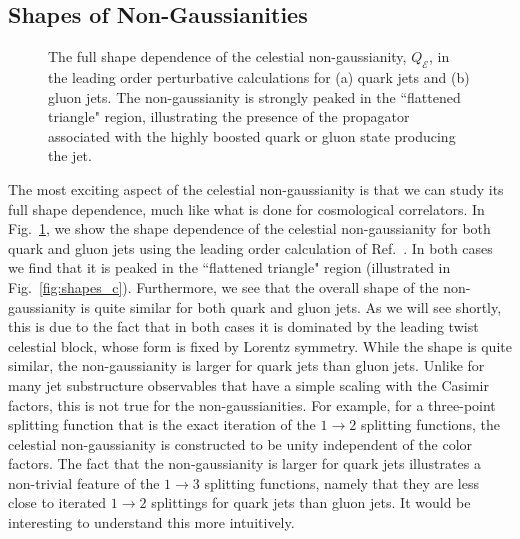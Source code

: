 \documentclass[letterpaper,11pt]{article}
\def\Fig#1{Fig.~{\ref{#1}}}
\def\to{\rightarrow}
\DeclareRobustCommand{\Fig}[1]{Fig.~\ref{#1}}
\DeclareRobustCommand{\Ref}[1]{Ref.~\cite{#1}}
\begin{document}
\subsection{Shapes of Non-Gaussianities}
\label{sec:shape_explain}

\begin{figure}[t]
\begin{center}
\qquad
{}%
\end{center}
\caption{
%
The full shape dependence of the celestial non-gaussianity, $Q_\mathcal{E}$, in the leading order perturbative calculations for (a) quark jets and (b) gluon jets. The non-gaussianity is strongly peaked in the  ``flattened triangle" region, illustrating the presence of the propagator associated with the highly boosted quark or gluon state producing the jet.}
\label{fig:pert_shape}
\end{figure}


The most exciting aspect of the celestial non-gaussianity is that we can study its full shape dependence, much like what is done for cosmological correlators.
%
In \Fig{fig:pert_shape}, we show the shape dependence of the celestial non-gaussianity for both quark and gluon jets using the leading order calculation of \Ref{Chen:2019bpb}.
%
In both cases we find that it is peaked in the ``flattened triangle" region (illustrated in \Fig{fig:shapes_c}).
%
Furthermore, we see that the overall shape of the non-gaussianity is quite similar for both quark and gluon jets.
%
As we will see shortly, this is due to the fact that in both cases it is dominated by the leading twist celestial block, whose form is fixed by Lorentz symmetry.
%
While the shape is quite similar, the non-gaussianity is larger for quark jets than gluon jets. Unlike for many jet substructure observables that have a simple scaling with the Casimir factors, this is not true for the non-gaussianities. For example, for a three-point splitting function that is the exact iteration of the $1\to 2$ splitting functions, the celestial non-gaussianity is constructed to be unity independent of the color factors. The fact that the non-gaussianity is larger for quark jets illustrates a non-trivial feature of the $1\to 3$ splitting functions, namely that they are less close to iterated $1\to 2$ splittings for quark jets than gluon jets. It would be interesting to understand this more intuitively.
\end{document}
